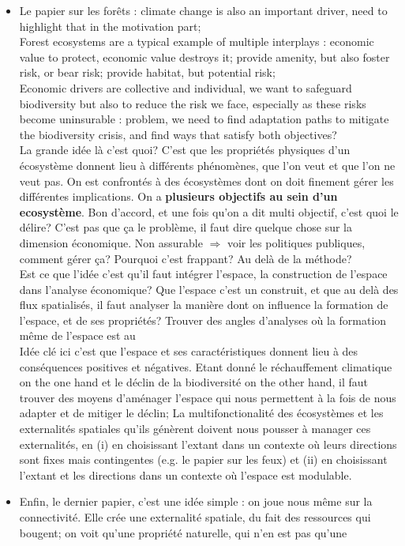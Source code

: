 \begin{itemize}
\item Le papier sur les forêts : climate change is also an important driver, need to highlight that in the motivation part; \\
Forest ecosystems are a typical example of multiple interplays : economic value to protect, economic value destroys it; provide amenity, but also foster risk, or bear risk; provide habitat, but potential risk; \\
Economic drivers are collective and individual, we want to safeguard biodiversity but also to reduce the risk we face, especially as these risks become uninsurable : problem, we need to find adaptation paths to mitigate the biodiversity crisis, and find ways that satisfy both objectives? 
\\
La grande idée là c'est quoi? C'est que les propriétés physiques d'un écosystème donnent lieu à différents phénomènes, que l'on veut et que l'on ne veut pas. On est confrontés à des écosystèmes dont on doit finement gérer les différentes implications. On a \textbf{plusieurs objectifs au sein d'un ecosystème}. Bon d'accord, et une fois qu'on a dit multi objectif, c'est quoi le délire? C'est pas que ça le problème, il faut dire quelque chose sur la dimension économique. Non assurable $\Rightarrow$ voir les politiques publiques, comment gérer ça? Pourquoi c'est frappant? Au delà de la méthode? 
\\
Est ce que l'idée c'est qu'il faut intégrer l'espace, la construction de l'espace dans l'analyse économique? Que l'espace c'est un construit, et que au delà des flux spatialisés, il faut analyser la manière dont on influence la formation de l'espace, et de ses propriétés? Trouver des angles d'analyses où la formation même de l'espace est au 
\\
Idée clé ici c'est que l'espace et ses caractéristiques donnent lieu à des conséquences positives et négatives. Etant donné le réchauffement climatique on the one hand et le déclin de la biodiversité on the other hand, il faut trouver des moyens d'aménager l'espace qui nous permettent à la fois de nous adapter et de mitiger le déclin; La multifonctionalité des écosystèmes et les externalités spatiales qu'ils génèrent doivent nous pousser à manager ces externalités, en (i) en choisissant l'extant dans un contexte où leurs directions sont fixes mais contingentes (e.g. le papier sur les feux) et (ii) en choisissant l'extant et les directions dans un contexte où l'espace est modulable. 

\item Enfin, le dernier papier, c'est une idée simple : on joue nous même sur la connectivité. Elle crée une externalité spatiale, du fait des ressources qui bougent; on voit qu'une propriété naturelle, qui n'en est pas qu'une 

\end{itemize}




